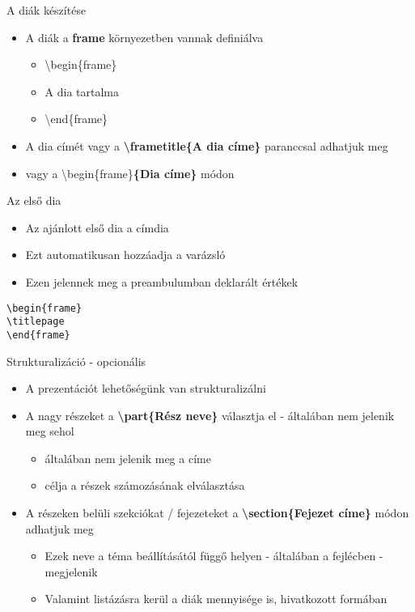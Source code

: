 \documentclass[11pt]{beamer}
\newcommand{\tbs}{\textbackslash}
\begin{document}
\begin{frame}{A diák készítése}
\begin{itemize}
\item A diák a \textbf{frame} környezetben vannak definiálva
	\begin{itemize}
	\item \tbs begin\{frame\}
	\item A dia tartalma
	\item \tbs end\{frame\}
	\end{itemize}
\item A dia címét vagy a \textbf{\tbs frametitle\{A dia címe\}} paranccsal adhatjuk meg
\item vagy a \tbs begin\{frame\}\textbf{\{Dia címe\}}  módon
\end{itemize}
\end{frame}

\begin{frame}[fragile]{Az első dia}
\begin{itemize}
\item Az ajánlott első dia a címdia
\item Ezt automatikusan hozzáadja a varázsló
\item Ezen jelennek meg a preambulumban deklarált értékek
\end{itemize}

\vspace{1cm}

\verb|\begin{frame}| \\
\verb|\titlepage| \\
\verb|\end{frame}|
\end{frame}

\begin{frame}{Strukturalizáció - opcionális}
\begin{itemize}
\item A prezentációt lehetőségünk van strukturalizálni
\item A nagy részeket a \textbf{\tbs part\{Rész neve\}} választja el - általában nem jelenik meg sehol
	\begin{itemize}
	\item általában nem jelenik meg a címe
	\item célja a részek számozásának elválasztása
	\end{itemize}
\item A részeken belüli szekciókat / fejezeteket a \textbf{\tbs section\{Fejezet címe\}} módon adhatjuk meg
	\begin{itemize}
	\item Ezek neve a téma beállításától függő helyen - általában a fejlécben - megjelenik
	\item Valamint listázásra kerül a diák mennyisége is, hivatkozott formában
	\end{itemize}
\end{itemize}
\end{frame}
\end{document}
